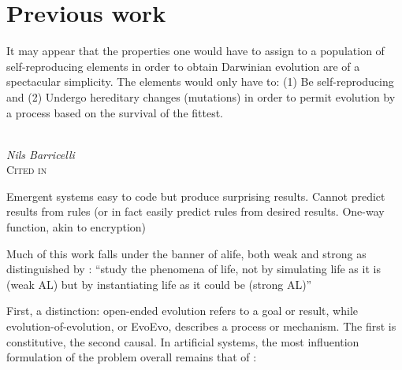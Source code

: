 \chapter{Previous work}\label{previous-work}

\epigraph{%
It may appear that the properties one would have to assign to a population of self-reproducing elements in order to obtain Darwinian evolution are of a spectacular simplicity. The elements would only have to: (1) Be self-reproducing and (2) Undergo hereditary changes (mutations) in order to permit evolution by a process based on the survival of the fittest.}%
{\textit{\\Nils Barricelli}\\\textsc{Cited in \cite{Taylor2001}}}
\begin{NOTES}
Emergent systems easy to code but produce surprising results. Cannot predict results from rules (or in fact easily predict rules from desired results. One-way function, akin to encryption) \parencite{Nellis2014}

Much of this work falls under the banner of \gls{alife}, both weak and strong as distinguished by \cite{Langton1989}: ``study the phenomena of life, not by simulating life as it is (weak AL) but by instantiating life as it could be (strong AL)''

First, a distinction: open-ended evolution refers to a goal or result, while evolution-of-evolution, or EvoEvo, describes a process or mechanism. The first is constitutive, the second causal. In artificial systems, the most influention formulation of the problem overall remains that of \cite{Bedau:2000mi}:

\end{NOTES}
